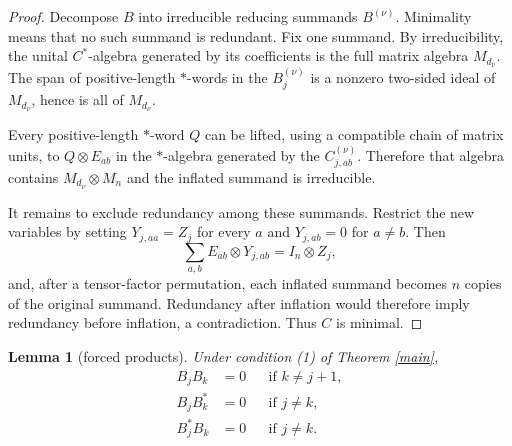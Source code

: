 \documentclass[11pt]{article}
\newtheorem{lemma}[theorem]{Lemma}
\begin{document}
\begin{proof}
Decompose $B$ into irreducible reducing summands $B^{(\nu)}$.  Minimality
means that no such summand is redundant.  Fix one summand.  By irreducibility,
the unital $C^*$-algebra generated by its coefficients is the full matrix
algebra $M_{d_\nu}$.  The span of positive-length $*$-words in the
$B_j^{(\nu)}$ is a nonzero two-sided ideal of $M_{d_\nu}$, hence is all of
$M_{d_\nu}$.

Every positive-length $*$-word $Q$ can be lifted, using a compatible chain of
matrix units, to $Q\otimes E_{ab}$ in the $*$-algebra generated by the
$C_{j,ab}^{(\nu)}$.  Therefore that algebra contains
$M_{d_\nu}\otimes M_n$ and the inflated summand is irreducible.

It remains to exclude redundancy among these summands.  Restrict the new
variables by setting $Y_{j,aa}=Z_j$ for every $a$ and
$Y_{j,ab}=0$ for $a\ne b$.  Then
\[
 \sum_{a,b}E_{ab}\otimes Y_{j,ab}=I_n\otimes Z_j,
\]
and, after a tensor-factor permutation, each inflated summand becomes $n$
copies of the original summand.  Redundancy after inflation would therefore
imply redundancy before inflation, a contradiction.  Thus $C$ is minimal.
\end{proof}

\begin{lemma}[forced products]\label{products}
Under condition (1) of Theorem \ref{main},
\begin{align}
 B_jB_k&=0 &&\text{if }k\ne j+1,\label{same}\\
 B_jB_k^*&=0 &&\text{if }j\ne k,\label{right}\\
 B_j^*B_k&=0 &&\text{if }j\ne k.\label{left}
\end{align}
\end{lemma}
\end{document}
